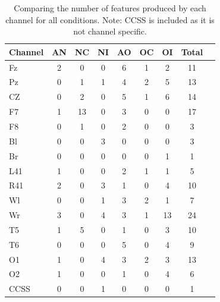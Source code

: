 \documentclass[Afour,times,sageh]{sagej}
\begin{document}
\begin{table}
\centering
\begin{tabular}{l*{7}{c}r}
Channel            & AN & NC & NI & AO & OC  & OI &Total\\
\hline
Fz &2&0&0&6&1&2&11\\
Pz &0&1&1&4&2&5&13\\
CZ &0&2&0&5&1&6&14\\
F7 &1&13&0&3&0&0&17\\
F8 &0&1&0&2&0&0&3\\
Bl &0&0&3&0&0&0&3\\
Br &0&0&0&0&0&1&1\\
L41 &1&0&0&2&1&1&5\\
R41 &2&0&3&1&0&4&10\\
Wl &0&0&1&3&2&1&7\\
Wr &3&0&4&3&1&13&24\\
T5 &1&5&0&1&0&3&10\\
T6 &0&0&0&5&0&4&9\\
O1 &1&0&4&3&2&3&13\\
O2 &1&0&0&1&0&4&6\\
CCSS &0&0&1&0&0&0&1
\end{tabular}
\caption{Comparing the number of features produced by each channel for all conditions. Note: CCSS is included as it is not channel specific.}
\label{T3}
\end{table}
\end{document}
